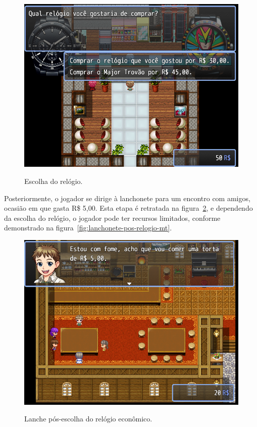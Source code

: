 \begin{figure}[!htbp]
	\centering
	\caption{Escolha do relógio.}
	\includegraphics[scale=0.5]{Textuais/Pictures/escolha-relogio.png}
	\label{fig:escolha-relogio}
\end{figure}

Posteriormente, o jogador se dirige à lanchonete para um encontro com amigos, ocasião em que gasta R\$ 5,00. Esta etapa é retratada na figura~\ref{fig:lanchonete-pos-relogio}, e dependendo da escolha do relógio, o jogador pode ter recursos limitados, conforme demonstrado na figura~\ref{fig:lanchonete-pos-relogio-mt}.

\begin{figure}[!htbp]
	\centering
	\caption{Lanche pós-escolha do relógio econômico.}
	\includegraphics[scale=0.5]{Textuais/Pictures/lanchonete-pos-relogio.png}
	\label{fig:lanchonete-pos-relogio}
\end{figure}

